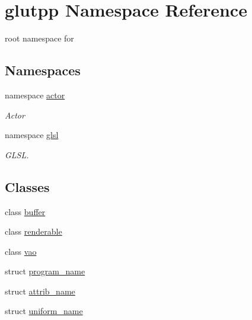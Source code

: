 \hypertarget{namespaceglutpp}{\section{glutpp \-Namespace \-Reference}
\label{namespaceglutpp}
}


root namespace for   


\subsection*{\-Namespaces}
\begin{DoxyCompactItemize}
\item 
namespace \hyperlink{namespaceglutpp_1_1actor}{actor}
\begin{DoxyCompactList}\small\item\em \-Actor \end{DoxyCompactList}\item 
namespace \hyperlink{namespaceglutpp_1_1glsl}{glsl}
\begin{DoxyCompactList}\small\item\em \-G\-L\-S\-L. \end{DoxyCompactList}\end{DoxyCompactItemize}
\subsection*{\-Classes}
\begin{DoxyCompactItemize}
\item 
class \hyperlink{classglutpp_1_1buffer}{buffer}
\item 
class \hyperlink{classglutpp_1_1renderable}{renderable}
\item 
class \hyperlink{classglutpp_1_1vao}{vao}
\item 
struct \hyperlink{structglutpp_1_1program__name}{program\-\_\-name}
\item 
struct \hyperlink{structglutpp_1_1attrib__name}{attrib\-\_\-name}
\item 
struct \hyperlink{structglutpp_1_1uniform__name}{uniform\-\_\-name}
\end{DoxyCompactItemize}
